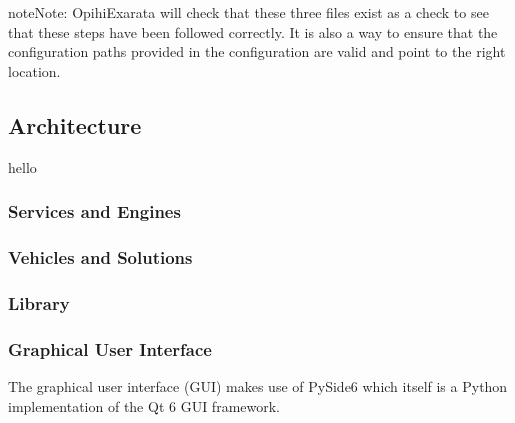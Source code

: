 \documentclass[letterpaper,11pt,english]{sphinxmanual}
\begin{document}
\begin{sphinxadmonition}{note}{Note:}
\sphinxAtStartPar
OpihiExarata will check that these three files exist as a check to see
that these steps have been followed correctly. It is also a way to ensure
that the configuration paths provided in the configuration are valid and
point to the right location.
\end{sphinxadmonition}

\sphinxstepscope


\subsection{Architecture}
\label{\detokenize{technical/architecture/index:architecture}}\label{\detokenize{technical/architecture/index:technical-architecture}}\label{\detokenize{technical/architecture/index::doc}}
\sphinxAtStartPar
hello

\sphinxstepscope


\subsubsection{Services and Engines}
\label{\detokenize{technical/architecture/services_engines:services-and-engines}}\label{\detokenize{technical/architecture/services_engines:technical-architecture-services-engines}}\label{\detokenize{technical/architecture/services_engines::doc}}
\sphinxstepscope


\subsubsection{Vehicles and Solutions}
\label{\detokenize{technical/architecture/vehicles_solutions:vehicles-and-solutions}}\label{\detokenize{technical/architecture/vehicles_solutions:technical-architecture-vehicles-solutions}}\label{\detokenize{technical/architecture/vehicles_solutions::doc}}
\sphinxstepscope


\subsubsection{Library}
\label{\detokenize{technical/architecture/library:library}}\label{\detokenize{technical/architecture/library:technical-architecture-library}}\label{\detokenize{technical/architecture/library::doc}}
\sphinxstepscope


\subsubsection{Graphical User Interface}
\label{\detokenize{technical/architecture/graphical_user_interface:graphical-user-interface}}\label{\detokenize{technical/architecture/graphical_user_interface:technical-architecture-graphical-user-interface}}\label{\detokenize{technical/architecture/graphical_user_interface::doc}}
\sphinxAtStartPar
The graphical user interface (GUI) makes use of PySide6 which itself is a
Python implementation of the Qt 6 GUI framework.
\end{document}
